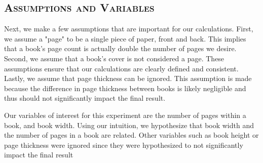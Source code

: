 \documentclass[10pt, twocolumn]{article}
\theoremstyle{definition}
\theoremstyle{remark}
\begin{document}
    \subsection*{\textsc{Assumptions and Variables}}{
        Next, we make a few assumptions that are important for our calculations. First, we assume a "page" to be a single piece of paper, front and back. This implies that a book's page count is actually double the number of pages we desire. Second, we assume that a book's cover is not considered a page. These assumptions ensure that our calculations are clearly defined and consistent. Lastly, we assume that page thickness can be ignored. This assumption is made because the difference in page thickness between books is likely negligible and thus should not significantly impact the final result.
        
        Our variables of interest for this experiment are the number of pages within a book, and book width. Using our intuition, we hypothesize that book width and the number of pages in a book are related. Other variables such as book height or page thickness were ignored since they were hypothesized to not significantly impact the final result
    }
\end{document}
